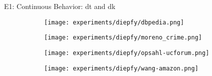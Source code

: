 \begin{frame}[fragile]{E1: Continuous Behavior: \acrshort{dt} and \acrshort{dk}}
  \begin{figure}[!htp]
    \centering
    \begin{subfigure}[t]{0.45\textwidth}
     \texttt{[image: experiments/diepfy/dbpedia.png]}
    \end{subfigure}\hfill
    \begin{subfigure}[t]{0.45\textwidth}
     \texttt{[image: experiments/diepfy/moreno\_crime.png]}
    \end{subfigure}
    \vspace{0.5cm}
  
    \begin{subfigure}[t]{0.45\textwidth}
     \texttt{[image: experiments/diepfy/opsahl-ucforum.png]}
    \end{subfigure}\hfill
    \begin{subfigure}[t]{0.45\textwidth}
      \texttt{[image: experiments/diepfy/wang-amazon.png]}
     \end{subfigure}
   \end{figure}
  \end{frame}

